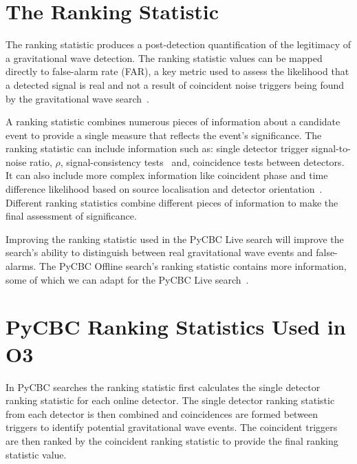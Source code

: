 \section{\label{5:sec:ranking-stat}The Ranking Statistic}

The ranking statistic produces a post-detection quantification of the legitimacy of a gravitational wave detection. The ranking statistic values can be mapped directly to false-alarm rate (FAR), a key metric used to assess the likelihood that a detected signal is real and not a result of coincident noise triggers being found by the gravitational wave search~\cite{PyCBC_global:2020}.

A ranking statistic combines numerous pieces of information about a candidate event to provide a single measure that reflects the event's significance. The ranking statistic can include information such as: single detector trigger signal-to-noise ratio, $\rho$, signal-consistency tests~\cite{Allen_Chi:2005, rw_snr_eq:2012, PyCBC_sg:2018} and, coincidence tests between detectors. It can also include more complex information like coincident phase and time difference likelihood based on source localisation and detector orientation~\cite{PyCBC:2017, PyCBC_singles:2022}. Different ranking statistics combine different pieces of information to make the final assessment of significance.

Improving the ranking statistic used in the PyCBC Live search will improve the search's ability to distinguish between real gravitational wave events and false-alarms. The PyCBC Offline search's ranking statistic contains more information, some of which we can adapt for the PyCBC Live search~\cite{PSD_var:2020, PyCBC:2017, PyCBC_global:2020}.

\section{\label{5:sec:previous-stat}PyCBC Ranking Statistics Used in O3}

In PyCBC searches the ranking statistic first calculates the single detector ranking statistic for each online detector. The single detector ranking statistic from each detector is then combined and coincidences are formed between triggers to identify potential gravitational wave events. The coincident triggers are then ranked by the coincident ranking statistic to provide the final ranking statistic value. 

